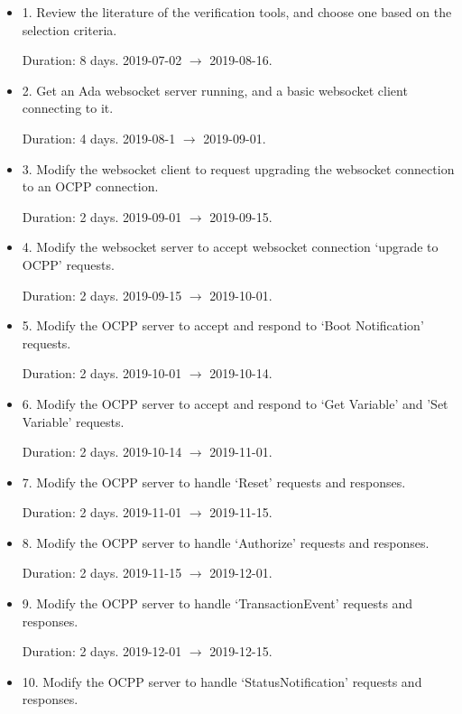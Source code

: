 \documentclass[12pt,openany,a4paper]{book}
\begin{document}
\begin{itemize}
	\item 1. Review the literature of the verification tools, and choose one based on the selection criteria.
	
	Duration: 8 days. 2019-07-02 $\rightarrow$ 2019-08-16.
	
	\item 2. Get an Ada websocket server running, and a basic websocket client connecting to it.
	
	Duration: 4 days. 2019-08-1 $\rightarrow$ 2019-09-01.
	
	\item 3. Modify the websocket client to request upgrading the websocket connection to an OCPP connection.
	
	Duration: 2 days. 2019-09-01 $\rightarrow$ 2019-09-15. 
	
	\item 4. Modify the websocket server to accept websocket connection `upgrade to OCPP' requests.
	
	Duration: 2 days. 2019-09-15 $\rightarrow$ 2019-10-01. 
	
	\item 5. Modify the OCPP server to accept and respond to `Boot Notification' requests.
	
	Duration: 2 days. 2019-10-01 $\rightarrow$ 2019-10-14.
	
	\item 6. Modify the OCPP server to accept and respond to `Get Variable' and 'Set Variable' requests.	
	
	Duration: 2 days. 2019-10-14 $\rightarrow$ 2019-11-01.
	
	\item 7. Modify the OCPP server to handle `Reset' requests and responses.	
	
	Duration: 2 days. 2019-11-01 $\rightarrow$ 2019-11-15.
	
	\item 8. Modify the OCPP server to handle `Authorize' requests and responses.
	
	Duration: 2 days. 2019-11-15 $\rightarrow$ 2019-12-01.
	
	\item 9. Modify the OCPP server to handle `TransactionEvent' requests and responses.	
	
	Duration: 2 days. 2019-12-01 $\rightarrow$ 2019-12-15.
	
	\item 10. Modify the OCPP server to handle `StatusNotification' requests and responses.	
	

\end{itemize}
\end{document}

